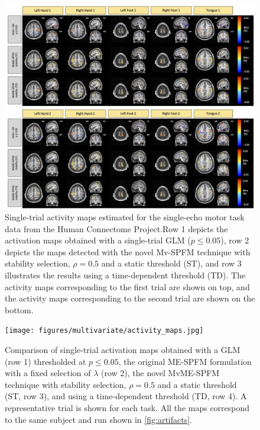 \begin{figure}[t!]
    \centerline{\includegraphics[width=\textwidth]{figures/multivariate/hcp_motor.jpg}}
    \caption{Single-trial activity maps estimated for the single-echo motor task
    data from the Human Connectome Project.Row 1 depicts the activation maps
    obtained with a single-trial GLM ($p \leq 0.05$), row 2 depicts the maps
    detected with the novel Mv-SPFM technique with stability selection,
    $\rho=0.5$ and a static threshold (ST), and row 3 illustrates the results
    using a time-dependent threshold (TD). The activity maps corresponding to
    the first trial are shown on top, and the activity maps corresponding to the
    second trial are shown on the bottom.}
\label{fig:hcp_motor}
\end{figure}

\begin{figure}[ht!]
    \centerline{\texttt{[image: figures/multivariate/activity\_maps.jpg]}}
    \caption{Comparison of single-trial activation maps obtained with a GLM (row
    1) thresholded at $p \leq 0.05$, the original ME-SPFM formulation with a
    fixed selection of $\lambda$ (row 2), the novel MvME-SPFM technique with
    stability selection, $\rho=0.5$ and a static threshold (ST, row 3), and
    using a time-dependent threshold (TD, row 4). A representative trial is
    shown for each task. All the maps correspond to the same subject and run
    shown in \cref{fig:artifacts}.}
\label{fig:activity_maps}
\end{figure}

